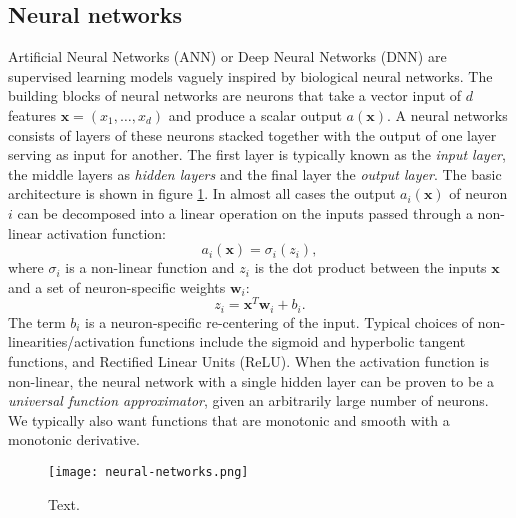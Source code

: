 \subsection{Neural networks}
Artificial Neural Networks (ANN) or Deep Neural Networks (DNN) are
supervised learning models vaguely inspired by biological neural networks.
The building blocks of neural networks are neurons that take a
vector input of $d$ features $\bm{x} = (x_1,\dots,x_d)$
and produce a scalar output $a(\bm{x})$.
A neural networks consists of layers of these neurons stacked together
with the output of one layer serving as input for another. The
first layer is typically known as the \textit{input layer}, the
middle layers as \textit{hidden layers} and the final layer
the \textit{output layer}. The basic architecture is shown in
figure \ref{fig:neural-networks}.
In almost all cases the output $a_i(\bm{x})$ of neuron $i$ can be decomposed
into a linear operation on the inputs passed through a non-linear
activation function:
$$ a_i(\bm{x}) = \sigma_i(z_i) ,$$
where $\sigma_i$ is a non-linear function and $z_i$
is the dot product between the inputs $\bm{x}$ and a set of
neuron-specific weights $\bm{w}_i$:
$$ z_i = \bm{x}^T \bm{w}_i + b_i .$$
The term $b_i$ is a neuron-specific re-centering of the input.
\newline
Typical choices of non-linearities/activation functions include
the sigmoid and hyperbolic tangent functions, and Rectified Linear Units (ReLU).
When the activation function is non-linear, the neural network with a single hidden
layer can be proven to be a \textit{universal function approximator},
given an arbitrarily large number of neurons. We typically also
want functions that are monotonic and smooth with a monotonic derivative.
\newline

\begin{figure}[h]
    \centering
    \texttt{[image: neural-networks.png]}
    \caption{Text.}
    \label{fig:neural-networks}
\end{figure}

